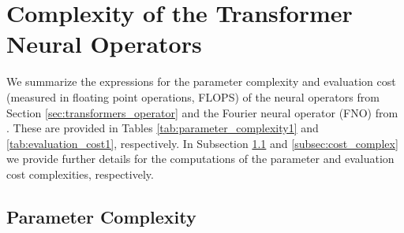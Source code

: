 \documentclass[twoside]{article}
\newcommand{\1}{\mathbbm{1}}
\begin{document}
\fi

\section{Complexity of the Transformer Neural Operators}
\label{Appendix:complexity}



We summarize the expressions for the parameter complexity and evaluation cost (measured in floating point operations, FLOPS) of the neural operators from Section \ref{sec:transformers_operator} and the Fourier neural operator (FNO) from \citet{li2021fourier}. These are provided in Tables \ref{tab:parameter_complexity1} and \ref{tab:evaluation_cost1}, respectively. In Subsection \ref{subsec:param_complex} and \ref{subsec:cost_complex} we provide further details for the computations of the parameter and evaluation cost complexities, respectively.

\subsection{Parameter Complexity}
\label{subsec:param_complex}
\end{document}
